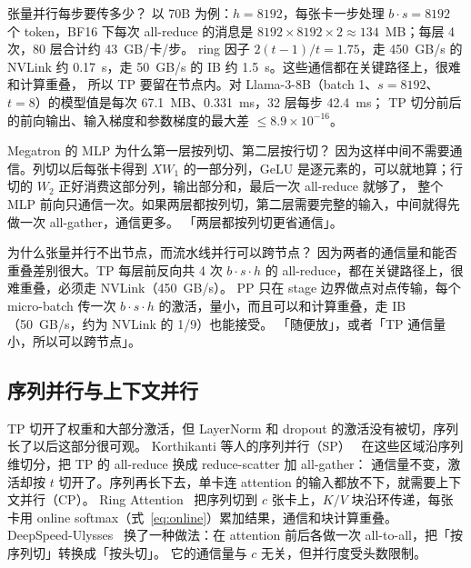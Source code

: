 \begin{est}{张量并行每步要传多少？}
以 70B 为例：$h=8192$，每张卡一步处理 $b\cdot s=8192$ 个 token，BF16 下每次 all-reduce 的消息是 $8192\times8192\times2\approx134$~MB；每层 4 次，80 层合计约 43~GB/卡/步。
ring 因子 $2(t-1)/t=1.75$，走 450~GB/s 的 NVLink 约 0.17~s，走 50~GB/s 的 IB 约 1.5~s。这些通信都在关键路径上，很难和计算重叠，
所以 TP 要留在节点内。对 Llama-3-8B（batch 1、$s=8192$、$t=8$）的模型值是每次 67.1~MB、0.331~ms，32 层每步 42.4~ms；
TP 切分前后的前向输出、输入梯度和参数梯度的最大差 $\le8.9\times10^{-16}$。
\end{est}

\begin{qa}{Megatron 的 MLP 为什么第一层按列切、第二层按行切？}
\ans 因为这样中间不需要通信。列切以后每张卡得到 $XW_1$ 的一部分列，GeLU 是逐元素的，可以就地算；行切的 $W_2$ 正好消费这部分列，输出部分和，最后一次 all-reduce 就够了，
整个 MLP 前向只通信一次。如果两层都按列切，第二层需要完整的输入，中间就得先做一次 all-gather，通信更多。
\wrong 「两层都按列切更省通信」。
\end{qa}

\begin{qa}{为什么张量并行不出节点，而流水线并行可以跨节点？}
\ans 因为两者的通信量和能否重叠差别很大。TP 每层前反向共 4 次 $b\cdot s\cdot h$ 的 all-reduce，都在关键路径上，很难重叠，必须走 NVLink（450~GB/s）。
PP 只在 stage 边界做点对点传输，每个 micro-batch 传一次 $b\cdot s\cdot h$ 的激活，量小，而且可以和计算重叠，走 IB（50~GB/s，约为 NVLink 的 1/9）也能接受。
\wrong 「随便放」，或者「TP 通信量小，所以可以跨节点」。
\end{qa}

\subsection{序列并行与上下文并行}

TP 切开了权重和大部分激活，但 LayerNorm 和 dropout 的激活没有被切，序列长了以后这部分很可观。
Korthikanti 等人的序列并行（SP）~\cite{korthikanti2023reducing} 在这些区域沿序列维切分，把 TP 的 all-reduce 换成 reduce-scatter 加 all-gather：
通信量不变，激活却按 $t$ 切开了。序列再长下去，单卡连 attention 的输入都放不下，就需要上下文并行（CP）。
Ring Attention~\cite{liu2023ring} 把序列切到 $c$ 张卡上，$K/V$ 块沿环传递，每张卡用 online softmax（式~\eqref{eq:online}）累加结果，通信和块计算重叠。
DeepSpeed-Ulysses~\cite{jacobs2023deepspeed} 换了一种做法：在 attention 前后各做一次 all-to-all，把「按序列切」转换成「按头切」。
它的通信量与 $c$ 无关，但并行度受头数限制。

